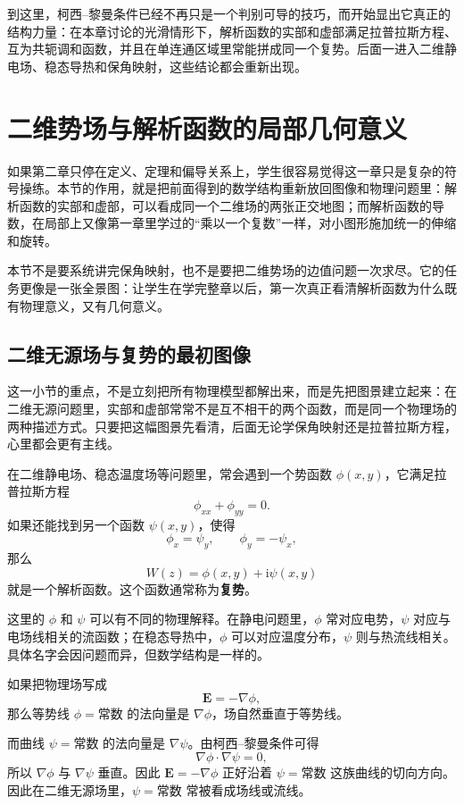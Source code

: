 \begin{tishi}[本节小结]
到这里，柯西--黎曼条件已经不再只是一个判别可导的技巧，而开始显出它真正的结构力量：在本章讨论的光滑情形下，解析函数的实部和虚部满足拉普拉斯方程、互为共轭调和函数，并且在单连通区域里常能拼成同一个复势。后面一进入二维静电场、稳态导热和保角映射，这些结论都会重新出现。
\end{tishi}

\section{二维势场与解析函数的局部几何意义}

\begin{wulibj}[为什么要用这一节收束全章]
如果第二章只停在定义、定理和偏导关系上，学生很容易觉得这一章只是复杂的符号操练。本节的作用，就是把前面得到的数学结构重新放回图像和物理问题里：解析函数的实部和虚部，可以看成同一个二维场的两张正交地图；而解析函数的导数，在局部上又像第一章里学过的``乘以一个复数''一样，对小图形施加统一的伸缩和旋转。

本节不是要系统讲完保角映射，也不是要把二维势场的边值问题一次求尽。它的任务更像是一张全景图：让学生在学完整章以后，第一次真正看清解析函数为什么既有物理意义，又有几何意义。
\end{wulibj}

\subsection{二维无源场与复势的最初图像}

这一小节的重点，不是立刻把所有物理模型都解出来，而是先把图景建立起来：在二维无源问题里，实部和虚部常常不是互不相干的两个函数，而是同一个物理场的两种描述方式。只要把这幅图景先看清，后面无论学保角映射还是拉普拉斯方程，心里都会更有主线。

在二维静电场、稳态温度场等问题里，常会遇到一个势函数 $\phi(x,y)$，它满足拉普拉斯方程
\[
    \phi_{xx}+\phi_{yy}=0.
\]
如果还能找到另一个函数 $\psi(x,y)$，使得
\[
    \phi_x=\psi_y,\qquad \phi_y=-\psi_x,
\]
那么
\[
    W(z)=\phi(x,y)+\mathrm{i}\psi(x,y)
\]
就是一个解析函数。这个函数通常称为\textbf{复势}。

\begin{zhu}{}{}
这里的 $\phi$ 和 $\psi$ 可以有不同的物理解释。在静电问题里，$\phi$ 常对应电势，$\psi$ 对应与电场线相关的流函数；在稳态导热中，$\phi$ 可以对应温度分布，$\psi$ 则与热流线相关。具体名字会因问题而异，但数学结构是一样的。
\end{zhu}

\begin{tishi}[为什么常把流函数等值线看成场线]
如果把物理场写成
\[
    \mathbf{E}=-\nabla\phi,
\]
那么等势线 $\phi=\text{常数}$ 的法向量是 $\nabla\phi$，场自然垂直于等势线。

而曲线 $\psi=\text{常数}$ 的法向量是 $\nabla\psi$。由柯西--黎曼条件可得
\[
    \nabla\phi\cdot\nabla\psi=0,
\]
所以 $\nabla\phi$ 与 $\nabla\psi$ 垂直。因此 $\mathbf{E}=-\nabla\phi$ 正好沿着 $\psi=\text{常数}$ 这族曲线的切向方向。因此在二维无源场里，$\psi=\text{常数}$ 常被看成场线或流线。
\end{tishi}

